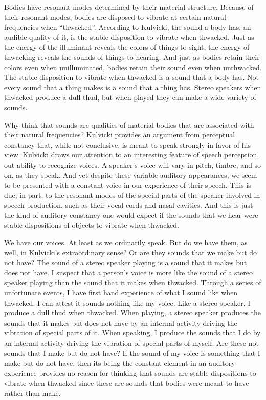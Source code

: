 \documentclass[12pt]{article}
\begin{document}
Bodies have resonant modes determined by their material structure. Because of their resonant modes, bodies are disposed to vibrate at certain natural frequencies when “thwacked”. According to Kulvicki, the sound a body has, an audible quality of it, is the stable disposition to vibrate when thwacked. Just as the energy of the illuminant reveals the colors of things to sight, the energy of thwacking reveals the sounds of things to hearing. And just as bodies retain their colors even when unilluminated, bodies retain their sound even when unthwacked. The stable disposition to vibrate when thwacked is a sound that a body has. Not every sound that a thing makes is a sound that a thing has. Stereo speakers when thwacked produce a dull thud, but when played they can make a wide variety of sounds.

Why think that sounds are qualities of material bodies that are associated with their natural frequencies? Kulvicki provides an argument from perceptual constancy that, while not conclusive, is meant to speak strongly in favor of his view. Kulvicki draws our attention to an interesting feature of speech perception, out ability to recognize voices. A speaker’s voice will vary in pitch, timbre, and so on, as they speak. And yet despite these variable auditory appearances, we seem to be presented with a constant voice in our experience of their speech. This is due, in part, to the resonant modes of the special parts of the speaker involved in speech production, such as their vocal cords and nasal cavities. And this is just the kind of auditory constancy one would expect if the sounds that we hear were stable dispositions of objects to vibrate when thwacked.

We have our voices. At least as we ordinarily speak. But do we have them, as well, in Kulvicki’s extraordinary sense? Or are they sounds that we make but do not have? The sound of a stereo speaker playing is a sound that it makes but does not have. I suspect that a person’s voice is more like the sound of a stereo speaker playing than the sound that it makes when thwacked. Through a series of unfortunate events, I have first hand experience of what I sound like when thwacked. I can attest it sounds nothing like my voice. Like a stereo speaker, I produce a dull thud when thwacked. When playing, a stereo speaker produces the sounds that it makes but does not have by an internal activity driving the vibration of special parts of it. When speaking, I produce the sounds that I do by an internal activity driving the vibration of special parts of myself. Are these not sounds that I make but do not have? If the sound of my voice is something that I make but do not have, then its being the constant element in an auditory experience provides no reason for thinking that sounds are stable dispositions to vibrate when thwacked since these are sounds that bodies were meant to have rather than make. 
\end{document}
